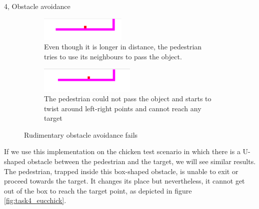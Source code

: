 \documentclass[10pt,a4paper]{article}
\begin{document}
\begin{task}{4, Obstacle avoidance}
\begin{figure}[H]
\begin{subfigure}[t]{0.5\textwidth}
 \end{subfigure}
 \hspace{1em}
\begin{subfigure}[t]{0.5\textwidth}
 \centering
 \includegraphics[width=0.45\textwidth]{images/task4_1object_passing_dummy.png}
 \caption{Even though it is longer in distance, the pedestrian tries to use its neighbours to pass the object.} 
 \end{subfigure}
 
\begin{center}   
\begin{subfigure}{0.5\textwidth}
 \centering
 \includegraphics[width=0.5\textwidth]{images/task4_1object_notpassed_dummy.png}
 \caption{The pedestrian could not pass the object and starts to twist around left-right points and cannot reach any target}

 \end{subfigure}
\end{center}
\caption{Rudimentary obstacle avoidance fails}
 \label{fig:task4_eucfault}
\end{figure}

If we use this implementation on the chicken test scenario in which there is a U-shaped obstacle between the pedestrian and the target, we will see similar results. The pedestrian, trapped inside this box-shaped obstacle, is unable to exit or proceed towards the target. It changes its place but nevertheless, it cannot get out of the box to reach the target point, as depicted in figure \ref{fig:task4_eucchick}. \\ 




\end{task}
\end{document}
